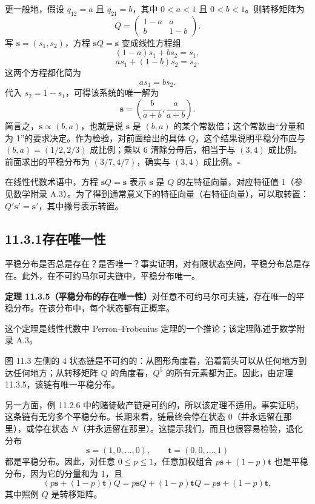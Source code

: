 \documentclass[UTF8,12pt,a4paper,fontset=fandol]{ctexart}
\begin{document}
更一般地，假设 $q_{12}=a$ 且 $q_{21}=b$，其中 $0<a<1$ 且 $0<b<1$。则转移矩阵为
\[
  Q=
  \begin{pmatrix}
    1-a & a\\
    b & 1-b
  \end{pmatrix}.
\]
写 $\mathbf s=(s_1,s_2)$，方程 $\mathbf sQ=\mathbf s$ 变成线性方程组
\[
  (1-a)s_1+bs_2=s_1,
\]
\[
  as_1+(1-b)s_2=s_2.
\]
这两个方程都化简为
\[
  as_1=bs_2.
\]
代入 $s_2=1-s_1$，可得该系统的唯一解为
\[
  \mathbf s=\left(\frac{b}{a+b},\frac{a}{a+b}\right).
\]
简言之，$\mathbf s\propto(b,a)$，也就是说 $\mathbf s$ 是 $(b,a)$ 的某个常数倍；这个常数由“分量和为 1”的要求决定。作为检验，对前面给出的具体 $Q$，这个结果说明平稳分布应与 $(b,a)=(1/2,2/3)$ 成比例；乘以 6 清除分母后，相当于与 $(3,4)$ 成比例。前面求出的平稳分布为 $(3/7,4/7)$，确实与 $(3,4)$ 成比例。$\square$

在线性代数术语中，方程 $\mathbf sQ=\mathbf s$ 表示 $\mathbf s$ 是 $Q$ 的左特征向量，对应特征值 1（参见数学附录 A.3）。为了得到通常意义下的特征向量（右特征向量），可以取转置：$Q'\mathbf s'=\mathbf s'$，其中撇号表示转置。

\subsection*{11.3.1\quad 存在唯一性}

平稳分布是否总是存在？是否唯一？事实证明，对有限状态空间，平稳分布总是存在。此外，在不可约马尔可夫链中，平稳分布唯一。

\noindent\textbf{定理 11.3.5（平稳分布的存在唯一性）}\quad 对任意不可约马尔可夫链，存在唯一的平稳分布。在该分布中，每个状态都有正概率。

这个定理是线性代数中 Perron--Frobenius 定理的一个推论；该定理陈述于数学附录 A.3。

图 11.3 左侧的 4 状态链是不可约的：从图形角度看，沿着箭头可以从任何地方到达任何地方；从转移矩阵 $Q$ 的角度看，$Q^5$ 的所有元素都为正。因此，由定理 11.3.5，该链有唯一平稳分布。

另一方面，例 11.2.6 中的赌徒破产链是可约的，所以该定理不适用。事实证明，这条链有无穷多个平稳分布。长期来看，链最终会停在状态 0（并永远留在那里），或停在状态 $N$（并永远留在那里）。这提示我们，而且也很容易检验，退化分布
\[
  \mathbf s=(1,0,\ldots,0),\qquad \mathbf t=(0,0,\ldots,1)
\]
都是平稳分布。因此，对任意 $0\le p\le1$，任意加权组合 $p\mathbf s+(1-p)\mathbf t$ 也是平稳分布，因为它的分量和为 1，且
\[
  (p\mathbf s+(1-p)\mathbf t)Q
  =
  p\mathbf sQ+(1-p)\mathbf tQ
  =
  p\mathbf s+(1-p)\mathbf t,
\]
其中照例 $Q$ 是转移矩阵。
\end{document}
